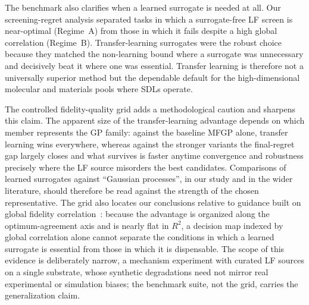 \documentclass[11pt,a4paper]{article}%
\begin{document}
The benchmark also clarifies when a learned surrogate is needed at all. Our
screening-regret analysis separated tasks in which a surrogate-free LF screen is
near-optimal (Regime~A) from those in which it fails despite a high global correlation
(Regime~B). Transfer-learning surrogates were the robust choice because they matched the
non-learning bound where a surrogate was unnecessary and decisively beat it where one was
essential. Transfer learning is therefore not a universally superior method but the dependable
default for the high-dimensional molecular and materials pools where SDLs operate.

The controlled fidelity-quality grid adds a methodological caution and sharpens this
claim. The apparent size of the transfer-learning advantage depends on which member
represents the GP family: against the baseline MFGP alone, transfer
learning wins everywhere, whereas against the stronger variants the final-regret gap
largely closes and what survives is faster anytime convergence and robustness
precisely where the LF source misorders the best candidates. Comparisons of
learned surrogates against ``Gaussian processes'', in our study and in the wider
literature, should therefore be read against the strength of the chosen
representative. The grid also locates our conclusions relative to guidance built on
global fidelity correlation~\citep{sabanza2025best}: because the advantage is
organized along the optimum-agreement axis and is nearly flat in $R^2$, a decision
map indexed by global correlation alone cannot separate the conditions in which a
learned surrogate is essential from those in which it is dispensable. The scope of
this evidence is deliberately narrow, a mechanism experiment with curated
LF sources on a single substrate, whose synthetic degradations need not mirror
real experimental or simulation biases; the benchmark suite, not the grid,
carries the generalization claim.
\end{document}
